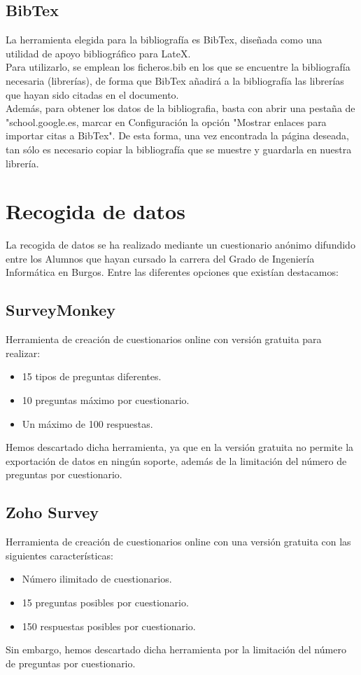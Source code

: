 \subsection{BibTex}
\nonzeroparskip
La herramienta elegida para la bibliografía es BibTex, diseñada como una utilidad de apoyo bibliográfico para LateX. \\
\nonzeroparskip
Para utilizarlo, se emplean los ficheros.bib en los que se encuentre la bibliografía necesaria (librerías), de forma que BibTex añadirá a la bibliografía las librerías que hayan sido citadas en el documento. \\
\nonzeroparskip
Además, para obtener los datos de la bibliografia, basta con abrir una pestaña de  "school.google.es, marcar en Configuración la opción "Mostrar enlaces para importar citas a BibTex". De esta forma, una vez encontrada la página deseada, tan sólo es necesario copiar la bibliografía que se muestre y guardarla en nuestra librería.\cite{perez1968titulo} 

\section{Recogida de datos}
La recogida de datos se ha realizado mediante un cuestionario anónimo difundido entre los Alumnos que hayan cursado la carrera del Grado de Ingeniería Informática en Burgos. Entre las diferentes opciones que existían destacamos: 
\subsection{SurveyMonkey}
Herramienta de creación de cuestionarios online con versión gratuita para realizar: 
\begin{itemize}
\item 15 tipos de preguntas diferentes. 
\item 10 preguntas máximo por cuestionario. 
\item Un máximo de 100 respuestas.  
\end{itemize}
Hemos descartado dicha herramienta, ya que en la versión gratuita no permite la exportación de datos en ningún soporte, además de la limitación del número de preguntas por cuestionario. 
\subsection{Zoho Survey}
Herramienta de creación de cuestionarios online con una versión gratuita con las siguientes características: 
\begin{itemize}
\item Número ilimitado de cuestionarios. 
\item 15 preguntas posibles por cuestionario. 
\item 150 respuestas posibles por cuestionario. 
\end{itemize}
Sin embargo, hemos descartado dicha herramienta por la limitación del número de preguntas por cuestionario. 

